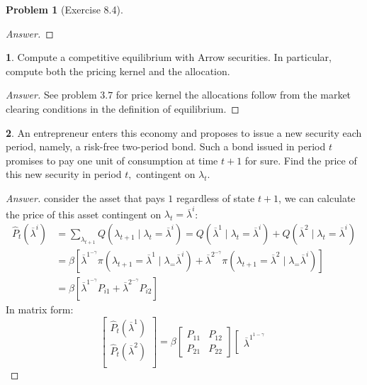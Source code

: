 \documentclass[12pt]{article}
\theoremstyle{definition}
\newtheorem{problem}{Problem}
\newtheorem{subproblem}{}[problem]
\begin{document}
\begin{problem}[Exercise 8.4]
\begin{proof}[Answer]
\end{proof}
\begin{subproblem}
Compute a competitive equilibrium with Arrow securities. In particular, compute both the pricing kernel and the allocation.
\end{subproblem}
\begin{proof}[Answer]
See problem $3.7$ for price kernel the allocations follow from the market clearing conditions in the definition of equilibrium.
\end{proof}
\begin{subproblem}
An entrepreneur enters this economy and proposes to issue a new security each period, namely, a risk-free two-period bond. Such a bond issued in period $t$ promises to pay one unit of consumption at time $t+1$ for sure. Find the price of this new security in period $t,$ contingent on $\lambda_{t} .$
\end{subproblem}
\begin{proof}[Answer]
consider the asset that pays $1$ regardless of state $t+1$, we can calculate the price of this asset contingent on $\lambda_t = \overline{\lambda}^i$:
\begin{align*}
\hat{P}_t(\overline{\lambda}^i) &= \sum_{\lambda_{t+1}}Q\left(\lambda_{t+1} \mid \lambda_{t}=\overline{\lambda}^i\right) = Q\left(\overline{\lambda}^1 \mid \lambda_{t}=\overline{\lambda}^i\right) + Q\left(\overline{\lambda}^2 \mid \lambda_{t}=\overline{\lambda}^i\right)\\
&= \beta \left[ \overline{\lambda}^1^{-\gamma} \pi\left(\lambda_{t+1}=\overline{\lambda}^1 \mid \lambda_=\overline{\lambda}^i\right) + \overline{\lambda}^2^{-\gamma} \pi\left(\lambda_{t+1}=\overline{\lambda}^2 \mid \lambda_=\overline{\lambda}^i\right)\right]\\
&=\beta \left[ \overline{\lambda}^1^{-\gamma} P_{i1} + \overline{\lambda}^2^{-\gamma} P_{i2}\right]
\end{align*}
In matrix form:
$$\left[\begin{array}{c}
    \hat{P}_t(\overline{\lambda}^1)\\
    \hat{P}_t(\overline{\lambda}^2)\\
\end{array}\right] =\beta  \left[\begin{array}{cc}
    P_{11} & P_{12}  \\
    P_{21} & P_{22}  
\end{array}\right]
  \left[\begin{array}{c}
    \overline{\lambda}^1^{1-\gamma}\\

\end{array}$$
\end{proof}
\end{problem}
\end{document}
